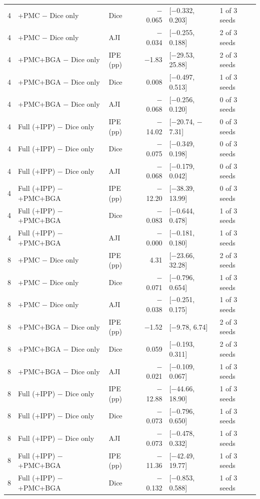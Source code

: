 \documentclass[10pt]{article}
\begin{document}
\begin{landscape}
{\begin{longtable}{r l l r l l}
4 & +PMC $-$ Dice only & Dice & $-$0.065 & [$-$0.332, 0.203] & 1 of 3 seeds \\
4 & +PMC $-$ Dice only & AJI & $-$0.034 & [$-$0.255, 0.188] & 2 of 3 seeds \\
4 & +PMC+BGA $-$ Dice only & IPE (pp) & $-$1.83 & [$-$29.53, 25.88] & 2 of 3 seeds \\
4 & +PMC+BGA $-$ Dice only & Dice & 0.008 & [$-$0.497, 0.513] & 1 of 3 seeds \\
4 & +PMC+BGA $-$ Dice only & AJI & $-$0.068 & [$-$0.256, 0.120] & 0 of 3 seeds \\
4 & Full (+IPP) $-$ Dice only & IPE (pp) & $-$14.02 & [$-$20.74, $-$7.31] & 0 of 3 seeds \\
4 & Full (+IPP) $-$ Dice only & Dice & $-$0.075 & [$-$0.349, 0.198] & 0 of 3 seeds \\
4 & Full (+IPP) $-$ Dice only & AJI & $-$0.068 & [$-$0.179, 0.042] & 0 of 3 seeds \\
4 & Full (+IPP) $-$ +PMC+BGA & IPE (pp) & $-$12.20 & [$-$38.39, 13.99] & 0 of 3 seeds \\
4 & Full (+IPP) $-$ +PMC+BGA & Dice & $-$0.083 & [$-$0.644, 0.478] & 1 of 3 seeds \\
4 & Full (+IPP) $-$ +PMC+BGA & AJI & $-$0.000 & [$-$0.181, 0.180] & 1 of 3 seeds \\
8 & +PMC $-$ Dice only & IPE (pp) & 4.31 & [$-$23.66, 32.28] & 2 of 3 seeds \\
8 & +PMC $-$ Dice only & Dice & $-$0.071 & [$-$0.796, 0.654] & 1 of 3 seeds \\
8 & +PMC $-$ Dice only & AJI & $-$0.038 & [$-$0.251, 0.175] & 1 of 3 seeds \\
8 & +PMC+BGA $-$ Dice only & IPE (pp) & $-$1.52 & [$-$9.78, 6.74] & 2 of 3 seeds \\
8 & +PMC+BGA $-$ Dice only & Dice & 0.059 & [$-$0.193, 0.311] & 2 of 3 seeds \\
8 & +PMC+BGA $-$ Dice only & AJI & $-$0.021 & [$-$0.109, 0.067] & 1 of 3 seeds \\
8 & Full (+IPP) $-$ Dice only & IPE (pp) & $-$12.88 & [$-$44.66, 18.90] & 1 of 3 seeds \\
8 & Full (+IPP) $-$ Dice only & Dice & $-$0.073 & [$-$0.796, 0.650] & 1 of 3 seeds \\
8 & Full (+IPP) $-$ Dice only & AJI & $-$0.073 & [$-$0.478, 0.332] & 1 of 3 seeds \\
8 & Full (+IPP) $-$ +PMC+BGA & IPE (pp) & $-$11.36 & [$-$42.49, 19.77] & 1 of 3 seeds \\
8 & Full (+IPP) $-$ +PMC+BGA & Dice & $-$0.132 & [$-$0.853, 0.588] & 1 of 3 seeds \\

\end{longtable}}
\end{landscape}
\end{document}
